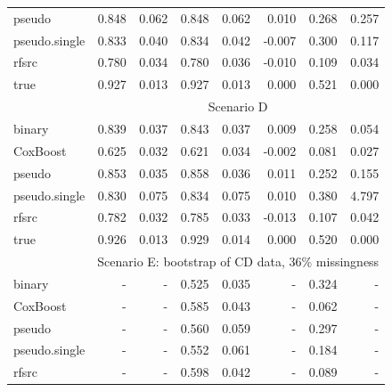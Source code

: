 \documentclass{statsoc}
\begin{document}
\begin{footnotesize}
\begin{table}
\begin{tabular}{lrrrrrrr}
pseudo & 0.848 & 0.062 & 0.848 & 0.062 & 0.010 & 0.268 & 0.257\\
pseudo.single & 0.833 & 0.040 & 0.834 & 0.042 & -0.007 & 0.300 & 0.117\\
rfsrc & 0.780 & 0.034 & 0.780 & 0.036 & -0.010 & 0.109 & 0.034\\
true & 0.927 & 0.013 & 0.927 & 0.013 & 0.000 & 0.521 & 0.000\\
\hline
& \multicolumn{7}{c}{Scenario D} \\
\hline
binary & 0.839 & 0.037 & 0.843 & 0.037 & 0.009 & 0.258 & 0.054\\
CoxBoost & 0.625 & 0.032 & 0.621 & 0.034 & -0.002 & 0.081 & 0.027\\
pseudo & 0.853 & 0.035 & 0.858 & 0.036 & 0.011 & 0.252 & 0.155\\
pseudo.single & 0.830 & 0.075 & 0.834 & 0.075 & 0.010 & 0.380 & 4.797\\
rfsrc & 0.782 & 0.032 & 0.785 & 0.033 & -0.013 & 0.107 & 0.042\\
true & 0.926 & 0.013 & 0.929 & 0.014 & 0.000 & 0.520 & 0.000\\
\hline
& \multicolumn{7}{c}{Scenario E: bootstrap of CD data, 36\% missingness} \\
\hline
binary & - & - & 0.525 & 0.035 & - & 0.324 & -\\
CoxBoost & - & - & 0.585 & 0.043 & - & 0.062 & -\\
pseudo & - & - & 0.560 & 0.059 & - & 0.297 & -\\
pseudo.single & - & - & 0.552 & 0.061 & - & 0.184 & -\\
rfsrc & - & - & 0.598 & 0.042 & - & 0.089 & -\\
\hline
\end{tabular}
\end{table}
\end{footnotesize}
\end{document}

